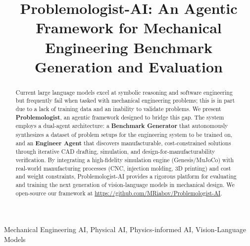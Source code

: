 \documentclass[conference]{IEEEtran}
\begin{document}
\title{Problemologist-AI: An Agentic Framework for Mechanical Engineering Benchmark Generation and Evaluation}

\author{
}

\maketitle

\begin{abstract}
Current large language models excel at symbolic reasoning and software engineering but frequently fail when tasked with mechanical engineering problems; this is in part due to a lack of training data and an inability to validate problems. We present \textbf{Problemologist}, an agentic framework designed to bridge this gap. The system employs a dual-agent architecture: a \textbf{Benchmark Generator} that autonomously synthesizes a dataset of problem setups for the engineering system to be trained on, and an \textbf{Engineer Agent} that discovers manufacturable, cost-constrained solutions through iterative CAD drafting, simulation, and design-for-manufacturability verification. By integrating a high-fidelity simulation engine (Genesis/MuJoCo) with real-world manufacturing processes (CNC, injection molding, 3D printing) and cost and weight constraints, Problemologist-AI provides a rigorous platform for evaluating and training the next generation of vision-language models in mechanical design. We open-source our framework at \url{https://github.com/MRiabov/Problemologist-AI}.
\end{abstract}

\begin{IEEEkeywords}
Mechanical Engineering AI, Physical AI, Physics-informed AI, Vision-Language Models
\end{IEEEkeywords}
\end{document}

